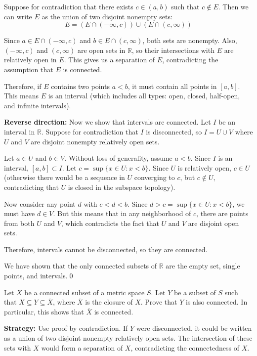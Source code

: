 Suppose for contradiction that there exists $c \in (a,b)$ such that $c \notin E$. Then we can write $E$ as the union of two disjoint nonempty sets:
\[E = (E \cap (-\infty, c)) \cup (E \cap (c, \infty))\]

Since $a \in E \cap (-\infty, c)$ and $b \in E \cap (c, \infty)$, both sets are nonempty. Also, $(-\infty, c)$ and $(c, \infty)$ are open sets in $\mathbb{R}$, so their intersections with $E$ are relatively open in $E$. This gives us a separation of $E$, contradicting the assumption that $E$ is connected.

Therefore, if $E$ contains two points $a < b$, it must contain all points in $[a,b]$. This means $E$ is an interval (which includes all types: open, closed, half-open, and infinite intervals).

\textbf{Reverse direction:} Now we show that intervals are connected. Let $I$ be an interval in $\mathbb{R}$. Suppose for contradiction that $I$ is disconnected, so $I = U \cup V$ where $U$ and $V$ are disjoint nonempty relatively open sets.

Let $a \in U$ and $b \in V$. Without loss of generality, assume $a < b$. Since $I$ is an interval, $[a,b] \subset I$. Let $c = \sup\{x \in U : x < b\}$. Since $U$ is relatively open, $c \in U$ (otherwise there would be a sequence in $U$ converging to $c$, but $c \notin U$, contradicting that $U$ is closed in the subspace topology).

Now consider any point $d$ with $c < d < b$. Since $d > c = \sup\{x \in U : x < b\}$, we must have $d \in V$. But this means that in any neighborhood of $c$, there are points from both $U$ and $V$, which contradicts the fact that $U$ and $V$ are disjoint open sets.

Therefore, intervals cannot be disconnected, so they are connected.

We have shown that the only connected subsets of $\mathbb{R}$ are the empty set, single points, and intervals.\qed



\begin{problembox}
Let $X$ be a connected subset of a metric space $S$. Let $Y$ be a subset of $S$ such that $X \subseteq Y \subseteq \overline{X}$, where $\overline{X}$ is the closure of $X$. Prove that $Y$ is also connected. In particular, this shows that $\overline{X}$ is connected.
\end{problembox}

\noindent\textbf{Strategy:} Use proof by contradiction. If $Y$ were disconnected, it could be written as a union of two disjoint nonempty relatively open sets. The intersection of these sets with $X$ would form a separation of $X$, contradicting the connectedness of $X$.

